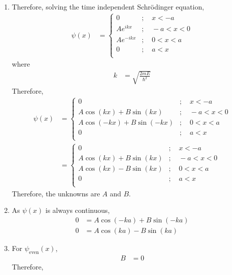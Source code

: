 \documentclass[fleqn, a4paper, 11pt, oneside]{amsart}
\theoremstyle{definition}
\theoremstyle{theorem}
\begin{document}
\begin{solution}
\begin{enumerate}
\begin{figure}[H]
\begin{tikzpicture}
				\end{tikzpicture}
			\end{figure}
		\item
			Therefore, solving the time independent Schrödinger equation,
			\begin{align*}
				\psi(x) &=
					\begin{cases}
						0 &;\quad x < -a\\
						A e^{i k x} &;\quad -a < x < 0\\
						A e^{-i k x} &;\quad 0 < x < a\\
						0 &;\quad a < x\\
					\end{cases}
			\end{align*}
			where
			\begin{align*}
				k &= \sqrt{\frac{2 m E}{\hbar^2}}
			\end{align*}
			Therefore,
			\begin{align*}
				\psi(x) &=
					\begin{cases}
						0 &;\quad x < -a\\
						A \cos(k x) + B \sin(k x) &;\quad -a < x < 0\\
						A \cos(-k x) + B \sin(-k x) &;\quad 0 < x < a\\
						0 &;\quad a < x\\
					\end{cases}\\
				&=
					\begin{cases}
						0 &;\quad x < -a\\
						A \cos(k x) + B \sin(k x) &;\quad -a < x < 0\\
						A \cos(k x) - B \sin(k x) &;\quad 0 < x < a\\
						0 &;\quad a < x\\
					\end{cases}
			\end{align*}
			Therefore, the unknowns are $A$ and $B$.
		\item
			As $\psi(x)$ is always continuous,
			\begin{align*}
				0 &= A \cos(-k a) + B \sin(-k a)\\
				0 &= A \cos(k a) - B \sin(k a)
			\end{align*}
		\item
			For $\psi_{\text{even}}(x)$,
			\begin{align*}
				B &= 0
			\end{align*}
			Therefore,
			\begin{align*}

\end{align*}
\end{enumerate}
\end{solution}
\end{document}
